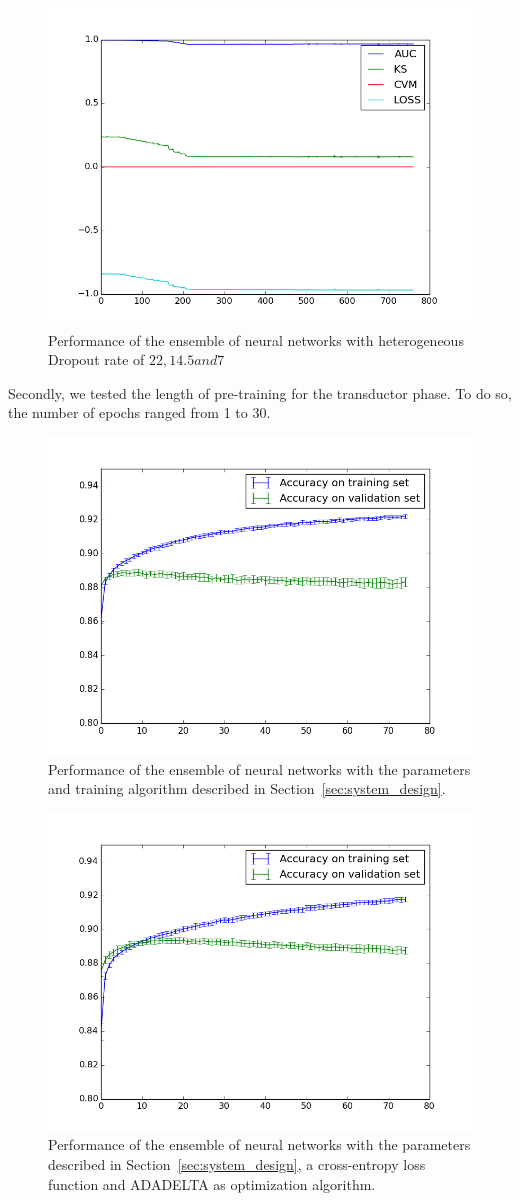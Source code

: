 \documentclass[conference]{IEEEtran}
\begin{document}
\begin{figure}[!ht]
	\centering
	\includegraphics[width=.5\textwidth]{../imgs/transductor_stats_pt30.png}
	\caption{Performance of the ensemble of neural networks with heterogeneous Dropout rate of $22, 14.5 and 7$ }
	\label{fig:dropout_22_7}
\end{figure}

Secondly, we tested the length of pre-training for the transductor phase. To do so, the number of epochs ranged from 1 to 30.

\begin{figure}[!ht]
	\centering
	\includegraphics[width=.5\textwidth]{../imgs/ensemble_stats_d11.png}
	\caption{Performance of the ensemble of neural networks with the parameters
	and training algorithm described in Section~\ref{sec:system_design}.}
	\label{fig:ensemble_d11}
\end{figure}

\begin{figure}[!ht]
	\centering
	\includegraphics[width=.5\textwidth]{../imgs/ensemble_stats_d11_adadelta.png}
	\caption{Performance of the ensemble of neural networks with the parameters
	described in Section~\ref{sec:system_design}, a cross-entropy loss function
	and ADADELTA as optimization algorithm.}
	\label{fig:ensemble_d11_adadelta}
\end{figure}
\end{document}
